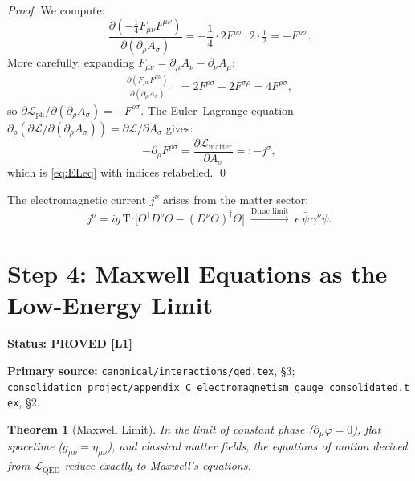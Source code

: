 \documentclass[11pt,a4paper]{article}
\newtheorem{theorem}{Theorem}
\newcommand{\Lone}{\textbf{[L1]}}
\newcommand{\PROVED}{\textbf{PROVED}}
\begin{document}
\begin{proof}
We compute:
\begin{equation}
  \frac{\partial(-\tfrac{1}{4}F_{\mu\nu}F^{\mu\nu})}{\partial(\partial_\rho A_\sigma)}
  = -\frac{1}{4}\cdot 2 F^{\rho\sigma} \cdot 2 \cdot \tfrac{1}{2}
  = -F^{\rho\sigma}.
\end{equation}
More carefully, expanding $F_{\mu\nu} = \partial_\mu A_\nu - \partial_\nu A_\mu$:
\begin{align}
  \frac{\partial(F_{\mu\nu}F^{\mu\nu})}{\partial(\partial_\rho A_\sigma)}
  &= 2F^{\rho\sigma} - 2F^{\sigma\rho}
   = 4F^{\rho\sigma},
\end{align}
so $\partial\mathcal{L}_{\mathrm{ph}}/\partial(\partial_\rho A_\sigma)
= -F^{\rho\sigma}$.
The Euler--Lagrange equation
$\partial_\rho(\partial\mathcal{L}/\partial(\partial_\rho A_\sigma))
= \partial\mathcal{L}/\partial A_\sigma$ gives:
\begin{equation}
  -\partial_\rho F^{\rho\sigma} = \frac{\partial\mathcal{L}_{\mathrm{matter}}}{\partial A_\sigma}
  =: -j^\sigma,
\end{equation}
which is \eqref{eq:ELeq} with indices relabelled. \qed
\end{proof}

The electromagnetic current $j^\nu$ arises from the matter sector:
\begin{equation}\label{eq:em_current}
  j^\nu = ig\,\mathrm{Tr}\bigl[\Theta^\dagger D^\nu\Theta
           - (D^\nu\Theta)^\dagger\Theta\bigr]
  \;\xrightarrow{\text{Dirac limit}}\;
  e\,\bar\psi\,\gamma^\nu\psi.
\end{equation}

\section{Step 4: Maxwell Equations as the Low-Energy Limit}

\noindent\textbf{Status: \PROVED{} \Lone}

\noindent\textbf{Primary source:}
\texttt{canonical/interactions/qed.tex}, \S3;
\texttt{consolidation\_project/appendix\_C\_electromagnetism\_gauge\_consolidated.tex}, \S2.

\medskip

\begin{theorem}[Maxwell Limit]
\label{thm:maxwell}
In the limit of constant phase ($\partial_\mu\varphi = 0$), flat spacetime
($g_{\mu\nu} = \eta_{\mu\nu}$), and classical matter fields, the equations of
motion derived from $\mathcal{L}_{\mathrm{QED}}$ reduce exactly to Maxwell's
equations.
\end{theorem}
\end{document}
